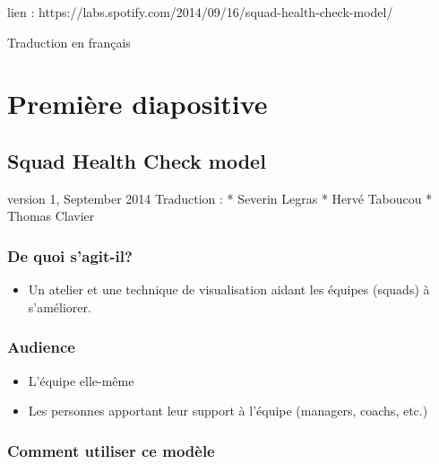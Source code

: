 lien : https://labs.spotify.com/2014/09/16/squad-health-check-model/

Traduction en français

\section{Première diapositive}\hypertarget{premire-diapositive}{}\label{premire-diapositive}

\subsection{Squad Health Check model}\hypertarget{squad-health-check-model}{}\label{squad-health-check-model}

version 1, September 2014
Traduction : 
* Severin Legras
* Hervé Taboucou
* Thomas Clavier

\subsubsection{De quoi s'agit-il?}\hypertarget{de-quoi-sagit-il}{}\label{de-quoi-sagit-il}

\begin{itemize}
\item Un atelier et une technique de visualisation aidant les équipes (squads) à s'améliorer.
\end{itemize}

\subsubsection{Audience}\hypertarget{audience}{}\label{audience}

\begin{itemize}
\item L'équipe elle-même
\item Les personnes apportant leur support à l'équipe (managers, coachs, etc.)
\end{itemize}

\subsubsection{Comment utiliser ce modèle}\hypertarget{comment-utiliser-ce-modle}{}\label{comment-utiliser-ce-modle}

